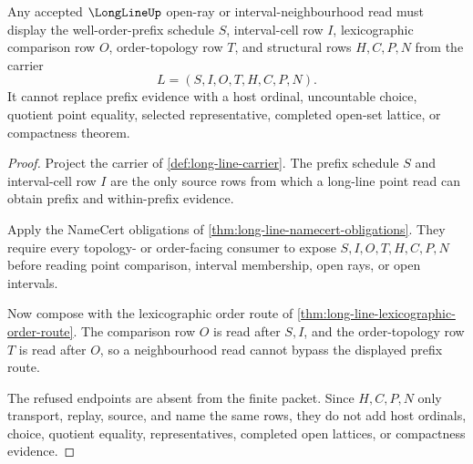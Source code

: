 \begin{theorem}
\label{thm:long-line-prefix-neighbourhood-exactness}
Any accepted $\LongLineUp$ open-ray or interval-neighbourhood read must display the well-order-prefix schedule $S$, interval-cell row $I$, lexicographic comparison row $O$, order-topology row $T$, and structural rows $H,C,P,N$ from the carrier
$$
L=(S,I,O,T,H,C,P,N).
$$
It cannot replace prefix evidence with a host ordinal, uncountable choice, quotient point equality, selected representative, completed open-set lattice, or compactness theorem.
\end{theorem}
\begin{proof}
Project the carrier of \autoref{def:long-line-carrier}. The prefix schedule $S$ and interval-cell row $I$ are the only source rows from which a long-line point read can obtain prefix and within-prefix evidence.

Apply the NameCert obligations of \autoref{thm:long-line-namecert-obligations}. They require every topology- or order-facing consumer to expose $S,I,O,T,H,C,P,N$ before reading point comparison, interval membership, open rays, or open intervals.

Now compose with the lexicographic order route of \autoref{thm:long-line-lexicographic-order-route}. The comparison row $O$ is read after $S,I$, and the order-topology row $T$ is read after $O$, so a neighbourhood read cannot bypass the displayed prefix route.

The refused endpoints are absent from the finite packet. Since $H,C,P,N$ only transport, replay, source, and name the same rows, they do not add host ordinals, choice, quotient equality, representatives, completed open lattices, or compactness evidence.
\end{proof}

